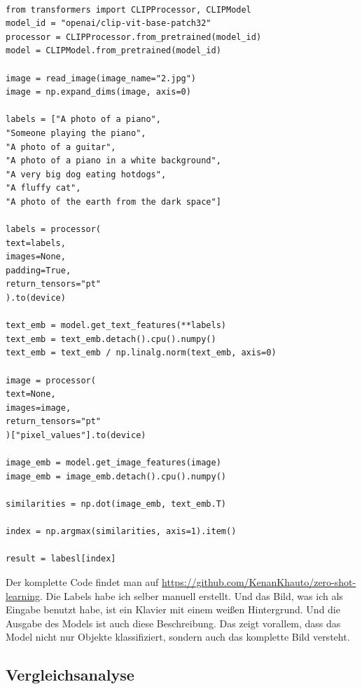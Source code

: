 \documentclass[nolibertine, ngerman, algorithm, nomencl, minted]{ttlab-qualify}
\begin{document}
\begin{verbatim}

from transformers import CLIPProcessor, CLIPModel
model_id = "openai/clip-vit-base-patch32"
processor = CLIPProcessor.from_pretrained(model_id)
model = CLIPModel.from_pretrained(model_id)

image = read_image(image_name="2.jpg")
image = np.expand_dims(image, axis=0)

labels = ["A photo of a piano", 
"Someone playing the piano", 
"A photo of a guitar", 
"A photo of a piano in a white background",
"A very big dog eating hotdogs", 
"A fluffy cat", 
"A photo of the earth from the dark space"]

labels = processor(
text=labels,
images=None,
padding=True,
return_tensors="pt"
).to(device)

text_emb = model.get_text_features(**labels)
text_emb = text_emb.detach().cpu().numpy()
text_emb = text_emb / np.linalg.norm(text_emb, axis=0)

image = processor(
text=None,
images=image,
return_tensors="pt"
)["pixel_values"].to(device)

image_emb = model.get_image_features(image)
image_emb = image_emb.detach().cpu().numpy()

similarities = np.dot(image_emb, text_emb.T)

index = np.argmax(similarities, axis=1).item()

result = labesl[index]
\end{verbatim}

Der komplette Code findet man auf \url{https://github.com/KenanKhauto/zero-shot-learning}.
Die Labels habe ich selber manuell erstellt.
Und das Bild, was ich als Eingabe benutzt habe, ist ein Klavier mit einem weißen Hintergrund. Und die Ausgabe des Models ist auch diese Beschreibung.
Das zeigt vorallem, dass das Model nicht nur Objekte klassifiziert, sondern auch das komplette Bild versteht.
\subsection{Vergleichsanalyse}
\end{document}
